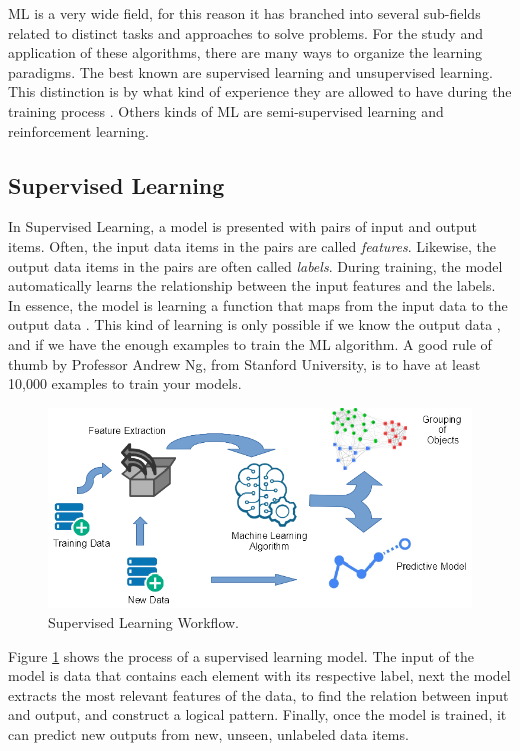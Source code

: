 \documentclass[12pt]{report}
\begin{document}
\ac{ML} is a very wide field, for this reason it has branched into several sub-fields related to distinct tasks \cite{Shai2014} and approaches to solve problems. For the study and application of these algorithms,  there are many ways to organize the learning paradigms. The best known are supervised learning and unsupervised learning. This distinction is by what kind of experience they are allowed to have during the training process \cite{Goodfellow2016}. Others kinds of {ML} are semi-supervised learning and reinforcement learning.


\subsection{Supervised Learning}
In Supervised Learning, a model is presented  with pairs of input and output items. Often, the input data items in the pairs are called {\em features}.
Likewise, the output data items in the pairs are often called  {\em labels}. 
During training, the model automatically learns   the relationship between the input features and the labels. In 
essence, the model is learning a  function that maps from the input data to the output data \cite{Russell2010} \cite{ Kelleher2015}. This kind of learning is only possible if we know the output data \cite{Nilsson1998}, and if we have the enough examples to train the {ML} algorithm. A good rule of thumb 
by Professor Andrew Ng, from Stanford University, is to have at least 10,000 examples to train your models.


\begin{figure}[H]	
	\centering	
	\includegraphics[width=150mm, scale = 1]{images/1_Supervised.png}
	\caption{Supervised Learning Workflow.}
	\label{figure:Supervised_Learning}
\end{figure}

Figure \ref{figure:Supervised_Learning} shows the process of a supervised learning model. The input of the model is data that contains each element with its respective label, next the model extracts the most relevant features of the data, to find the relation between input and output, and construct a logical pattern. Finally, once the model is trained,  it  can predict new outputs from  new, unseen, unlabeled data items.
\end{document}
